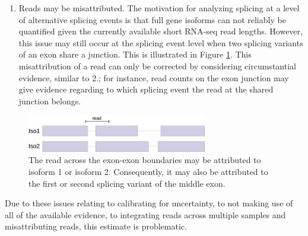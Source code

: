 \begin{enumerate}
	
	
	\item Reads may be misattributed. The motivation for analyzing splicing at a level of alternative splicing events is that full gene isoforms can not reliably be quantified given the currently available short RNA-seq read lengths. However, this issue may still occur at the splicing event level when two splicing variants of an exon share a junction. This is illustrated in Figure \ref{fig:misattribution}.
	This misattribution of a read can only be corrected by considering circumstantial evidence, similar to 2.; for instance, read counts on the exon junction may give evidence regarding to which splicing event the read at the shared junction belongs.
\end{enumerate}

\begin{figure}
	\centering\includegraphics[width=0.7\textwidth]{../visualizations/ch4-methods/visualizations-misattribution.pdf} 
	\caption{The read across the exon-exon boundaries may be attributed to isoform 1 or isoform 2. Consequently, it may also be attributed to the first or second splicing variant of the middle exon.}
	\label{fig:misattribution}
\end{figure}



Due to these issues relating to calibrating for uncertainty, to not making use of all of the available evidence, to integrating reads across multiple samples and misattributing reads, this estimate is problematic.

